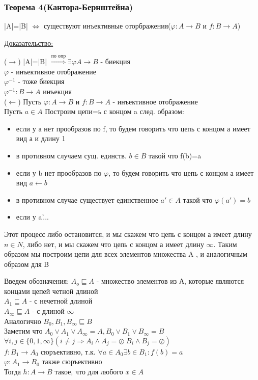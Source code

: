 \documentclass[12pt]{article}
\begin{document}
    \subsubsection*{Теорема 4(Кантора-Бернштейна)}\label{th:1.7.4}
    |A|=|B| $\Leftrightarrow$ существуют инъективные оторбражения($\varphi: A\rightarrow B$ и $f:B\rightarrow A$)\par\noindent
    \underline{Доказательство:}
    \begin{adjustwidth}{1.5em}{1.5em}
        ($\rightarrow$) |A|=|B| $\overset{\text{по опр}}{\Rightarrow} \exists \varphi A \rightarrow B$ - биекция\\
        $\varphi$ - инъективное отображение\\
        $\varphi^{-1}$ - тоже биекция\\
        $\varphi^{-1}: B\rightarrow A$ инъекция\\
        ($\leftarrow$) Пусть $\varphi: A\rightarrow B $ и $f:B \rightarrow A$ - инъективное отображение\\
        Пусть $a \in A$ Построим цепи=ь с концом a след. образом:
        \begin{itemize}
            \item если у а нет прообразов по f, то будем говорить что цепь с концом а имеет вид а и длину 1
            \item в противном случаем сущ. единств. $b \in B$ такой что f(b)=a
            \item если у b нет  прообразов по $\varphi$, то будем говорить что цепь с концом а имеет вид $a \leftarrow b$
            \item в противном случае существует единственное $a' \in A$ такой что $\varphi(a')=b$
            \item если у a'...
        \end{itemize}
        Этот процесс либо остановится, и мы скажем что цепь с концом а имеет длину $n \in N$, либо нет, и мы скажем
        что цепь с концом а имеет длину $\infty$. Таким образом мы построим цепи для всех элементов множества
        A , и аналогичным образом для B
    \end{adjustwidth}
    Введем обозначения: $A_o \sqsubseteq A$ - множество элементов из А, которые являются концами цепей
    четной длиной\\
    $A_1 \sqsubseteq A$ - с нечетной длиной\\
    $A_\infty \sqsubseteq A$ - с длиной $\infty$\\
    Аналогично $B_0,B_1,B_\infty \sqsubseteq B$\\
    Заметим что $A_0 \lor A_1 \lor A_\infty=A, B_0 \lor B_1 \lor B_\infty =B$\\
    $\forall i,j \in \{0,1,\infty\}(i \not = j \Rightarrow A_i \land A_j= \oslash \; B_i\land B_j=\oslash)$\\
    $f:B_1 \rightarrow A_0$ сюръективно, т.к. $\forall a \in A_0 \exists b \in B_1:f(b)=a$\\
    $\varphi: A_1 \rightarrow B_0$ также сюръективно\\
    Тогда $h: A \rightarrow B$ такое, что для любого $x \in A$
\end{document}
